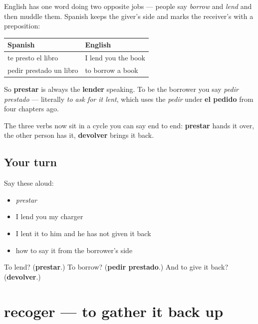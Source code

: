 \begin{grammarlens}[title={Grammar Lens: which way is it moving}]
English has one word doing two opposite jobs — people say \emph{borrow} and \emph{lend} and then muddle them. Spanish keeps the giver's side and marks the receiver's with a preposition:

\noindent
\begin{tabularx}{\linewidth}{@{}>{\raggedright\arraybackslash}X>{\raggedright\arraybackslash}X@{}}
\toprule
\textbf{Spanish} & \textbf{English} \\
\midrule
te presto el libro & I lend you the book \\
pedir prestado un libro & to borrow a book \\
\bottomrule
\end{tabularx}

So \textbf{prestar} is always the \textbf{lender} speaking. To be the borrower you say \emph{pedir prestado} — literally \emph{to ask for it lent}, which uses the \emph{pedir} under \textbf{el pedido} from four chapters ago.

The three verbs now sit in a cycle you can say end to end: \textbf{prestar} hands it over, the other person has it, \textbf{devolver} brings it back.
\end{grammarlens}

\subsection*{Your turn}
Say these aloud:

\begin{itemize}
\raggedright
  \item \emph{prestar}
  \item I lend you my charger
  \item I lent it to him and he has not given it back
  \item how to say it from the borrower's side
\end{itemize}

\begin{tcolorbox}[breakable,colback=teal!4,colframe=teal!35!black,title={Before you move on}]
To lend? (\textbf{prestar}.) To borrow? (\textbf{pedir prestado}.) And to give it back? (\textbf{devolver}.)
\end{tcolorbox}
\section[recoger]{recoger — to gather it back up}

